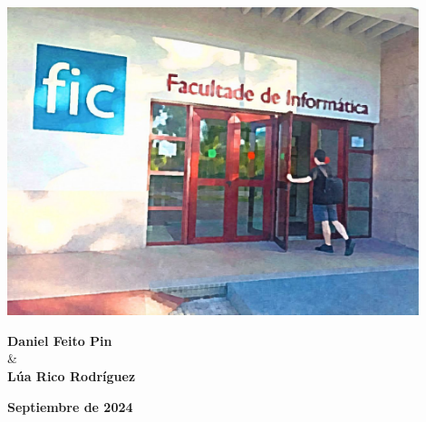 \begin{titlepage}
    \centering
    \vspace*{1cm}
    
    \Huge
    \textbf{\@title}
    
    \vspace{1.5cm}
    
    \includegraphics[width=0.9\textwidth]{titlepage/titlepage_picture.png}
    
    \vspace{2cm}
    
    \Large
    \textbf{Daniel Feito Pin}\\
    \&
    \\
    \textbf{Lúa Rico Rodríguez}
    
    \vfill
    
    \vspace{0.8cm}
    
    \large
    \textbf{Septiembre de 2024}
    
\end{titlepage}

